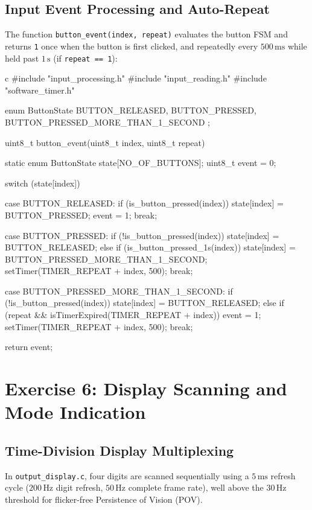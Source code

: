 \documentclass{hcmut-report}
\begin{document}
\subsection{Input Event Processing and Auto-Repeat}
The function \texttt{button\_event(index, repeat)} evaluates the button FSM and returns \texttt{1} once when the button is first clicked, and repeatedly every $500\,\text{ms}$ while held past $1\,\text{s}$ (if \texttt{repeat == 1}):
\begin{code}{c}
#include "input_processing.h"
#include "input_reading.h"
#include "software_timer.h"

enum ButtonState {
  BUTTON_RELEASED,
  BUTTON_PRESSED,
  BUTTON_PRESSED_MORE_THAN_1_SECOND
};

uint8_t button_event(uint8_t index, uint8_t repeat)
{
  static enum ButtonState state[NO_OF_BUTTONS];
  uint8_t event = 0;

  switch (state[index]) {
    case BUTTON_RELEASED:
      if (is_button_pressed(index)) {
        state[index] = BUTTON_PRESSED;
        event = 1;
      }
      break;

    case BUTTON_PRESSED:
      if (!is_button_pressed(index)) {
        state[index] = BUTTON_RELEASED;
      } else if (is_button_pressed_1s(index)) {
        state[index] = BUTTON_PRESSED_MORE_THAN_1_SECOND;
        setTimer(TIMER_REPEAT + index, 500);
      }
      break;

    case BUTTON_PRESSED_MORE_THAN_1_SECOND:
      if (!is_button_pressed(index)) {
        state[index] = BUTTON_RELEASED;
      } else if (repeat && isTimerExpired(TIMER_REPEAT + index)) {
        event = 1;
        setTimer(TIMER_REPEAT + index, 500);
      }
      break;
  }
  return event;
}
\end{code}


\newpage
\section{Exercise 6: Display Scanning and Mode Indication}

\subsection{Time-Division Display Multiplexing}
In \texttt{output\_display.c}, four digits are scanned sequentially using a $5\,\text{ms}$ refresh cycle ($200\,\text{Hz}$ digit refresh, $50\,\text{Hz}$ complete frame rate), well above the $30\,\text{Hz}$ threshold for flicker-free Persistence of Vision (POV).
\end{document}
